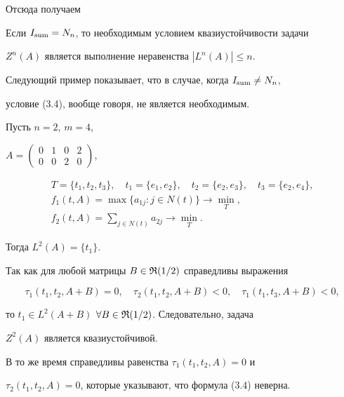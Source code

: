  


Отсюда получаем 


 


\begin{cors} 


Если $I_{\operatorname{sum}}=N_n$, то необходимым условием квазиустойчивости задачи 


$Z^n(A)$ является выполнение неравенства $|L^n(A)|\le n$.


\end{cors} 


 


Следующий пример показывает, что в случае, когда $I_{\operatorname{sum}}\ne N_n$, 


условие (3.4), вообще говоря, не является необходимым. 


 


\begin{exams} 


Пусть $n=2$, $m=4$, 


$A=\begin{pmatrix}0 & 1 & 0 & 2 \\ 0 & 0 & 2 & 0 \end{pmatrix}$, 


\begin{gather*} 


T=\{t_1,t_2,t_3\},\quad t_1=\{e_1,e_2\},\quad 


t_2=\{e_2,e_3\},\quad t_3=\{e_2,e_4\}, \\ 


f_1(t,A)=\max\{a_{1j}:j\in N(t)\}\to\min_T,\\ 


f_2(t,A)=\sum_{j\in N(t)}a_{2j}\to \min_T. 


\end{gather*} 


Тогда $L^2(A)=\{t_1\}$. 


 


Так как для любой матрицы $B\in\frak R(1/2)$ справедливы выражения 


$$ 


\tau_1(t_1,t_2,A+B)=0,\quad 


\tau_2(t_1,t_2,A+B)<0,\quad 


\tau_1(t_1,t_3,A+B)<0, 


$$ 


то $t_1\in L^2(A+B)$ $\forall B\in\frak R(1/2)$. Следовательно, задача 


$Z^2(A)$ является квазиустойчивой. 


 


В то же время справедливы равенства $\tau_1(t_1,t_2,A)=0$ и 


$\tau_2(t_1,t_2,A)=0$, которые указывают, что формула (3.4) неверна. 


\end{exams} 


